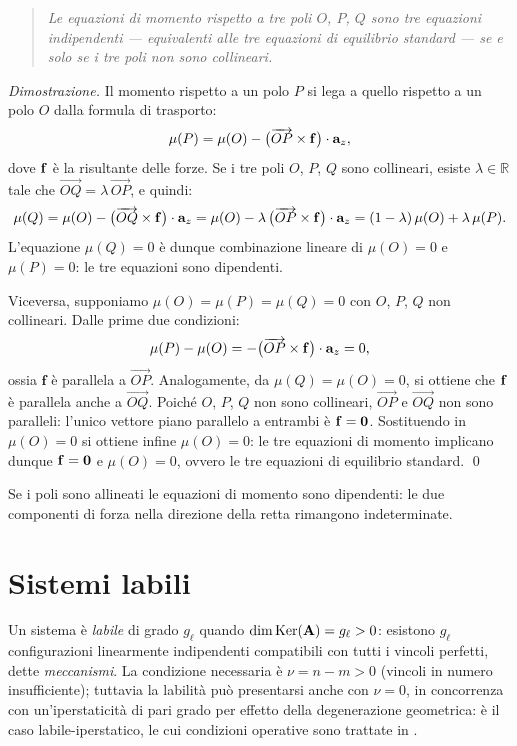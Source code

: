 \begin{quote}\itshape
Le equazioni di momento rispetto a tre poli $O$, $P$, $Q$
sono tre equazioni indipendenti --- equivalenti alle tre
equazioni di equilibrio standard --- se e solo se i tre poli
non sono collineari.
\end{quote}

\noindent\textit{Dimostrazione.}
	Il momento rispetto a un polo $P$ si lega a quello
	rispetto a un polo $O$ dalla formula di trasporto:
	\[
	\mu(P) = \mu(O) -
	\bigl(\overrightarrow{OP}\times \mathbf{f}\bigr)\cdot\mathbf{a}_z,
	\]
	dove $\mathbf{f}$ è la risultante delle forze. Se i tre poli
	$O$, $P$, $Q$ sono collineari, esiste
	$\lambda\in\mathbb{R}$ tale che
	$\overrightarrow{OQ} = \lambda\,\overrightarrow{OP}$,
	e quindi:
	\[
	\mu(Q)
	= \mu(O) -
	\bigl(\overrightarrow{OQ}\times\mathbf{f}\bigr)\cdot\mathbf{a}_z
	= \mu(O) - \lambda\,
	\bigl(\overrightarrow{OP}\times\mathbf{f}\bigr)\cdot\mathbf{a}_z
	= (1-\lambda)\,\mu(O) + \lambda\,\mu(P).
	\]
	L'equazione $\mu(Q) = 0$ è dunque combinazione lineare
	di $\mu(O) = 0$ e $\mu(P) = 0$: le tre equazioni sono
	dipendenti.
	
	Viceversa, supponiamo $\mu(O) = \mu(P) = \mu(Q) = 0$
	con $O$, $P$, $Q$ non collineari. Dalle prime due
	condizioni:
	\[
	\mu(P) - \mu(O)
	= -\bigl(\overrightarrow{OP}\times\mathbf{f}\bigr)
	\cdot\mathbf{a}_z = 0,
	\]
	ossia $\bm{f}$ è parallela a $\overrightarrow{OP}$.
	Analogamente, da $\mu(Q) = \mu(O) = 0$, si ottiene
	che $\mathbf{f}$ è parallela anche a $\overrightarrow{OQ}$.
	Poiché $O$, $P$, $Q$ non sono collineari,
	$\overrightarrow{OP}$ e $\overrightarrow{OQ}$ non sono
	paralleli: l'unico vettore piano parallelo a entrambi è
	$\mathbf{f} = \mathbf{0}$. Sostituendo in $\mu(O) = 0$ si
	ottiene infine $\mu(O) = 0$: le tre equazioni di momento
	implicano dunque $\mathbf{f} = \mathbf{0}$ e $\mu(O) = 0$,
	ovvero le tre equazioni di equilibrio standard.
\qed

Se i poli sono allineati le equazioni di momento sono
dipendenti: le due componenti di forza nella direzione
della retta rimangono indeterminate.





\section{Sistemi labili}\label{sec:labile}
Un sistema è \emph{labile} di grado $g_\ell$ quando
$\dim\operatorname{Ker}(\mathbf{A}) = g_\ell > 0$: esistono $g_\ell$ configurazioni
linearmente indipendenti compatibili con tutti i vincoli perfetti,
dette \emph{meccanismi}. La condizione necessaria è $\nu = n - m > 0$
(vincoli in numero insufficiente); tuttavia la labilità può presentarsi
anche con $\nu = 0$, in concorrenza con un'iperstaticità di pari grado
per effetto della degenerazione geometrica: è il caso labile-iperstatico,
le cui condizioni operative sono trattate in
.

